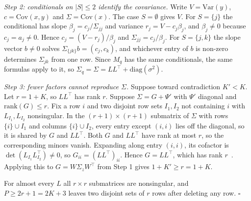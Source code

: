 \emph{Step 2: conditionals on $|S|\leq2$ identify the covariance.} Write $V=\mathrm{Var}(y)$, $c=\mathrm{Cov}(x,y)$
and $\Sigma=\mathrm{Cov}(x)$. The case $S=\emptyset$ gives $V$. For $S=\{j\}$ the conditional has slope
$\beta_j=c_j/\Sigma_{jj}$ and variance $r_j=V-c_j\beta_j$, and $\beta_j\neq0$ because $c_j=a_j\neq0$. Hence
$c_j=(V-r_j)/\beta_j$ and $\Sigma_{jj}=c_j/\beta_j$. For $S=\{j,k\}$ the slope vector $b\neq0$ solves
$\Sigma_{\{jk\}}b=(c_j,c_k)$, and whichever entry of $b$ is non-zero determines $\Sigma_{jk}$ from one row. Since
$M_q$ has the same conditionals, the same formulas apply to it, so $\Sigma_q=\Sigma=LL^\top+\mathrm{diag}(\sigma^2)$.

\emph{Step 3: fewer factors cannot reproduce $\Sigma$.} Suppose toward contradiction $K'<K$. Let $r=1+K$, so $LL^\top$ has rank $r$. Suppose
$\Sigma=G+\Psi'$ with $\Psi'$ diagonal and $\mathrm{rank}(G)\leq r$. Fix a row $i$ and two disjoint row sets $I_1,I_2$
not containing $i$ with $L_{I_1},L_{I_2}$ nonsingular. In the $(r+1)\times(r+1)$ submatrix of $\Sigma$ with rows
$\{i\}\cup I_1$ and columns $\{i\}\cup I_2$, every entry except $(i,i)$ lies off the diagonal, so it is shared by $G$
and $LL^\top$. Both $G$ and $LL^\top$ have rank at most $r$, so the corresponding minors vanish. Expanding along entry
$(i,i)$, its cofactor is $\det(L_{I_1}L_{I_2}^\top)\neq0$, so $G_{ii}=(LL^\top)_{ii}$. Hence $G=LL^\top$, which has
rank $r$~\citep{anderson1956statistical}. Applying this to $G=W\Sigma_zW^\top$ from Step 1 gives $1+K'\geq r=1+K$.

For almost every $L$ all $r\times r$ submatrices are nonsingular, and $P\geq2r+1=2K+3$ leaves two disjoint sets of $r$
rows after deleting any row. \hfill$\square$

